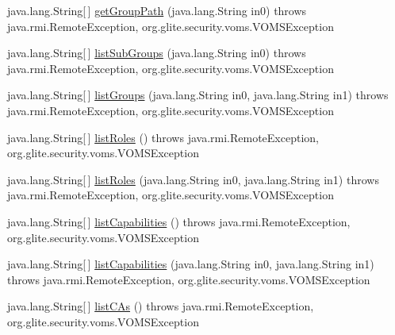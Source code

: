 \begin{DoxyCompactItemize}
\item 
java.lang.String\mbox{[}$\,$\mbox{]} \hyperlink{classorg_1_1glite_1_1security_1_1voms_1_1service_1_1admin_1_1VOMSAdminSoapBindingSkeleton_ac999e4040e586f710ae48c1dd4118888}{getGroupPath} (java.lang.String in0)  throws java.rmi.RemoteException, org.glite.security.voms.VOMSException     
\item 
java.lang.String\mbox{[}$\,$\mbox{]} \hyperlink{classorg_1_1glite_1_1security_1_1voms_1_1service_1_1admin_1_1VOMSAdminSoapBindingSkeleton_a28a774f0547b1201a9a763149e193032}{listSubGroups} (java.lang.String in0)  throws java.rmi.RemoteException, org.glite.security.voms.VOMSException     
\item 
java.lang.String\mbox{[}$\,$\mbox{]} \hyperlink{classorg_1_1glite_1_1security_1_1voms_1_1service_1_1admin_1_1VOMSAdminSoapBindingSkeleton_aa6f331663ccd9fb2cefd6c8f134b1064}{listGroups} (java.lang.String in0, java.lang.String in1)  throws java.rmi.RemoteException, org.glite.security.voms.VOMSException     
\item 
java.lang.String\mbox{[}$\,$\mbox{]} \hyperlink{classorg_1_1glite_1_1security_1_1voms_1_1service_1_1admin_1_1VOMSAdminSoapBindingSkeleton_abe36e6274b0799d4609a57b2f8277c45}{listRoles} ()  throws java.rmi.RemoteException, org.glite.security.voms.VOMSException     
\item 
java.lang.String\mbox{[}$\,$\mbox{]} \hyperlink{classorg_1_1glite_1_1security_1_1voms_1_1service_1_1admin_1_1VOMSAdminSoapBindingSkeleton_a486e98a89fbd6411444c8ddf57a16188}{listRoles} (java.lang.String in0, java.lang.String in1)  throws java.rmi.RemoteException, org.glite.security.voms.VOMSException     
\item 
java.lang.String\mbox{[}$\,$\mbox{]} \hyperlink{classorg_1_1glite_1_1security_1_1voms_1_1service_1_1admin_1_1VOMSAdminSoapBindingSkeleton_a859cc825a4b74a96d2c31184d07c4658}{listCapabilities} ()  throws java.rmi.RemoteException, org.glite.security.voms.VOMSException     
\item 
java.lang.String\mbox{[}$\,$\mbox{]} \hyperlink{classorg_1_1glite_1_1security_1_1voms_1_1service_1_1admin_1_1VOMSAdminSoapBindingSkeleton_a36caddfac84ba5a97842b80fbe760a1c}{listCapabilities} (java.lang.String in0, java.lang.String in1)  throws java.rmi.RemoteException, org.glite.security.voms.VOMSException     
\item 
java.lang.String\mbox{[}$\,$\mbox{]} \hyperlink{classorg_1_1glite_1_1security_1_1voms_1_1service_1_1admin_1_1VOMSAdminSoapBindingSkeleton_a39f12b021817b58a4a5ae532bf9f4c6c}{listCAs} ()  throws java.rmi.RemoteException, org.glite.security.voms.VOMSException     

\end{DoxyCompactItemize}
